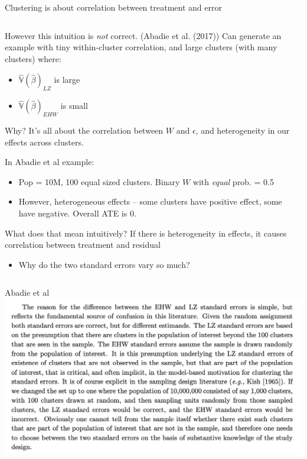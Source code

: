 \documentclass[notes,11pt, aspectratio=169]{beamer}
\newenvironment{wideitemize}{\itemize\addtolength{\itemsep}{10pt}}{\enditemize}
\begin{document}
\begin{frame}{Clustering is about correlation between treatment and error}
\begin{columns}[T] %
\begin{column}{.8\textwidth}
  \begin{wideitemize}
  \item However this intuition is \emph{not} correct.  (Abadie et
    al. (2017)) Can generate an example with tiny within-cluster
    correlation, and large clusters (with many clusters) where:
    \begin{itemize}
    \item $\hat{\mathbb{V}}(\hat{\beta})_{LZ}$ is large
    \item $\hat{\mathbb{V}}(\hat{\beta})_{EHW}$ is small
    \end{itemize}
  \item Why? It's all about the correlation between $W$ and
    $\epsilon$, and heterogeneity in our effects across clusters.
  \item In Abadie et al example:
    \begin{itemize}
    \item Pop = 10M, 100 equal sized clusters. Binary $W$ with
      \emph{equal} prob. = 0.5
    \item However, heterogeneous effects -- some clusters have
      positive effect, some have negative. Overall ATE is 0.
    \end{itemize}
  \item What does that mean intuitively? If there is heterogeneity in
    effects, it causes correlation between treatment and residual
    \begin{itemize}
  \item Why do the two standard errors vary so much? 
    \end{itemize}
  \end{wideitemize}
  \end{column}%
  \hfill%
  \begin{column}{.5\textwidth}
  \end{column}
\end{columns}
\end{frame}

\begin{frame}{Abadie et al}
  \includegraphics[width=\linewidth]{abadiecluster.png}
\end{frame}
\end{document}
